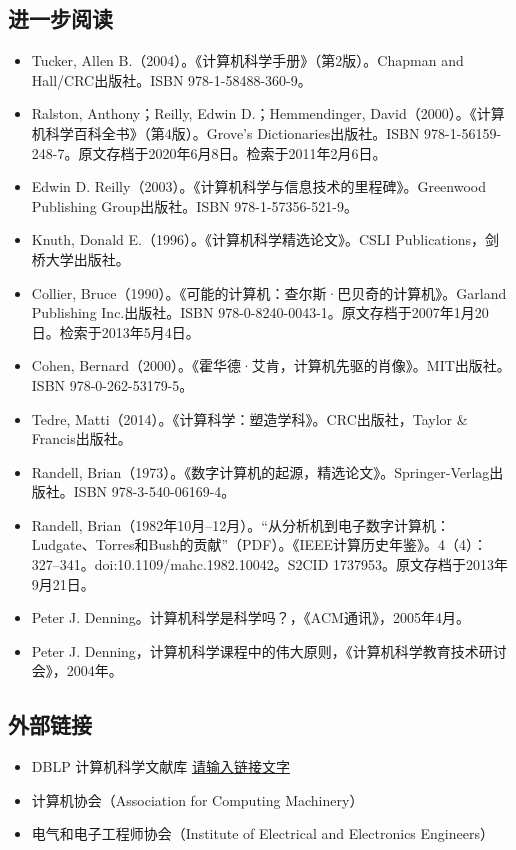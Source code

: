 \subsection{进一步阅读}  
\begin{itemize}
\item Tucker, Allen B.（2004）。《计算机科学手册》（第2版）。Chapman and Hall/CRC出版社。ISBN 978-1-58488-360-9。  
\item Ralston, Anthony；Reilly, Edwin D.；Hemmendinger, David（2000）。《计算机科学百科全书》（第4版）。Grove's Dictionaries出版社。ISBN 978-1-56159-248-7。原文存档于2020年6月8日。检索于2011年2月6日。  
\item Edwin D. Reilly（2003）。《计算机科学与信息技术的里程碑》。Greenwood Publishing Group出版社。ISBN 978-1-57356-521-9。  
\item Knuth, Donald E.（1996）。《计算机科学精选论文》。CSLI Publications，剑桥大学出版社。  
\item Collier, Bruce（1990）。《可能的计算机：查尔斯·巴贝奇的计算机》。Garland Publishing Inc.出版社。ISBN 978-0-8240-0043-1。原文存档于2007年1月20日。检索于2013年5月4日。  
\item Cohen, Bernard（2000）。《霍华德·艾肯，计算机先驱的肖像》。MIT出版社。ISBN 978-0-262-53179-5。  
\item Tedre, Matti（2014）。《计算科学：塑造学科》。CRC出版社，Taylor & Francis出版社。  
\item Randell, Brian（1973）。《数字计算机的起源，精选论文》。Springer-Verlag出版社。ISBN 978-3-540-06169-4。  
\item Randell, Brian（1982年10月–12月）。“从分析机到电子数字计算机：Ludgate、Torres和Bush的贡献”（PDF）。《IEEE计算历史年鉴》。4（4）：327–341。doi:10.1109/mahc.1982.10042。S2CID 1737953。原文存档于2013年9月21日。  
\item Peter J. Denning。计算机科学是科学吗？，《ACM通讯》，2005年4月。  
\item Peter J. Denning，计算机科学课程中的伟大原则，《计算机科学教育技术研讨会》，2004年。
\end{itemize}
\subsection{外部链接}
\begin{itemize}
\item DBLP 计算机科学文献库  \href{http://www.example.com}{请输入链接文字}
\item 计算机协会（Association for Computing Machinery）  
\item 电气和电子工程师协会（Institute of Electrical and Electronics Engineers）
\end{itemize}